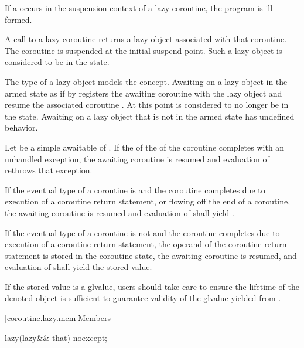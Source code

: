 {\pnum
If a  occurs
in the suspension context of a lazy coroutine,
the program is ill-formed.

\pnum
A call to a lazy coroutine  returns
a lazy object  associated with that coroutine.
The coroutine is suspended at
the initial suspend point.
Such a lazy object is considered to be in the  state.

\pnum
The type of a lazy object models the  concept.
Awaiting on a lazy object in the armed state
as if by 
registers the awaiting coroutine 
with the lazy object  and
resume the associated coroutine .
At this point  is considered to no longer be in the  state.
Awaiting on a lazy object that is not in the armed state has undefined behavior.

\pnum
Let  be a simple awaitable of .
If the  of the 
of the coroutine  completes with an unhandled exception,
the awaiting coroutine  is resumed and
evaluation of  rethrows that exception.

\pnum
If the eventual type of a coroutine  is 
and the coroutine completes due to execution of
a coroutine return statement, or
flowing off the end of a coroutine,
the awaiting coroutine  is resumed and
evaluation of  shall yield .

\pnum
If the eventual type of a coroutine  is not  and
the coroutine completes due to execution of a
coroutine return statement,
the operand of the coroutine return statement is stored in the coroutine state,
the awaiting coroutine  is resumed, and
evaluation of  shall yield the stored value.

\begin{note}
If the stored value is a glvalue, users should take care to ensure
the lifetime of the denoted object is sufficient to guarantee validity of the
glvalue yielded from .
\end{note}

[coroutine.lazy.mem]{Members}
\begin{itemdecl}
lazy(lazy&& that) noexcept;
\end{itemdecl}

}
